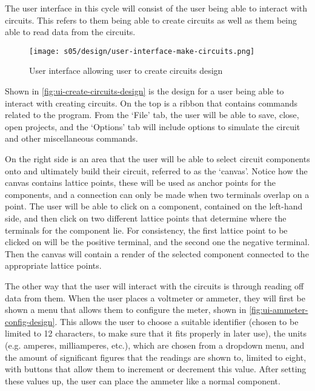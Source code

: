         The user interface in this cycle will consist of the user being able to interact with circuits. 
        This refers to them being able to create circuits as well as them being able to read data from the circuits.

        \begin{figure}[!ht]
            \centering
            \texttt{[image: s05/design/user-interface-make-circuits.png]}
            \caption{User interface allowing user to create circuits design}
            \label{fig:ui-create-circuits-design}
        \end{figure}

        Shown in \autoref{fig:ui-create-circuits-design} is the design for a user being able to interact with creating circuits. 
        On the top is a ribbon that contains commands related to the program. 
        From the `File' tab, the user will be able to save, close, open projects, and the `Options' tab will include options to simulate the circuit and other miscellaneous commands. 
        
        On the right side is an area that the user will be able to select circuit components onto and ultimately build their circuit, referred to as the `canvas'. 
        Notice how the canvas contains lattice points, these will be used as anchor points for the components, and a connection can only be made when two terminals overlap on a point. 
        The user will be able to click on a component, contained on the left-hand side, and then click on two different lattice points that determine where the terminals for the component lie. 
        For consistency, the first lattice point to be clicked on will be the positive terminal, and the second one the negative terminal. 
        Then the canvas will contain a render of the selected component connected to the appropriate lattice points.

        The other way that the user will interact with the circuits is through reading off data from them.
        When the user places a voltmeter or ammeter, they will first be shown a menu that allows them to configure the meter, shown in \autoref{fig:ui-ammeter-config-design}. 
        This allows the user to choose a suitable identifier (chosen to be limited to 12 characters, to make sure that it fits properly in later use), the units (e.g. amperes, milliamperes, etc.), which are chosen from a dropdown menu, and the amount of significant figures that the readings are shown to, limited to eight, with buttons that allow them to increment or decrement this value. 
        After setting these values up, the user can place the ammeter like a normal component. 

